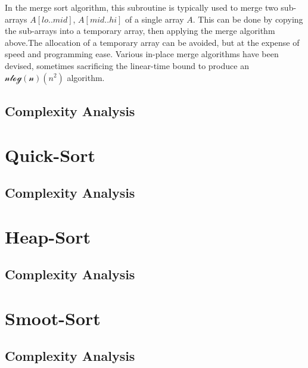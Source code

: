 In the merge sort algorithm, this subroutine is typically used to merge two sub-arrays $A[lo..mid]$, $A[mid..hi]$ of a single array $A$. This can be done by copying the sub-arrays into a temporary array, then applying the merge algorithm above.The allocation of a temporary array can be avoided, but at the expense of speed and programming ease. Various in-place merge algorithms have been devised, sometimes sacrificing the linear-time bound to produce an $\mathcal{nlog(n)}(n^2)$ algorithm.

\subsection{Complexity Analysis}

\section{Quick-Sort}

\subsection{Complexity Analysis}

\section{Heap-Sort}

\subsection{Complexity Analysis}

\section{Smoot-Sort}

\subsection{Complexity Analysis}